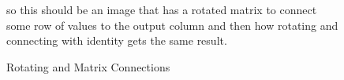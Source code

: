\begin{figure}
    so this should be an image that has a rotated matrix to connect some row of values to the output column and then how rotating and connecting with identity gets the same result.
    \centering
    \caption{Rotating and Matrix Connections}
    \label{rot_iden_same}
\end{figure}


